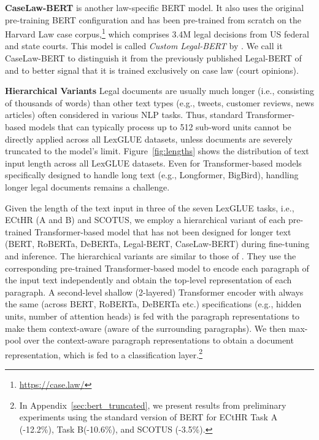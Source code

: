 \documentclass[11pt]{article}
\begin{document}
\noindent\textbf{CaseLaw-BERT} \cite{zhengguha2021} is another law-specific BERT model. It also uses the original pre-training BERT configuration and has been pre-trained from scratch on the Harvard Law case corpus,\footnote{\url{https://case.law/}} which comprises 3.4M legal decisions from US federal and state courts. This model is called \emph{Custom Legal-BERT} by  \citet{zhengguha2021}. We call it CaseLaw-BERT to distinguish it from the previously published Legal-BERT of \citet{chalkidis-etal-2020-legalbert} and to better signal that it is trained exclusively on case law (court opinions).\vspace{2mm}

\noindent\textbf{Hierarchical Variants} Legal documents are usually much longer (i.e., consisting of thousands of words) than other text types (e.g., tweets, customer reviews, news articles) often considered in various NLP tasks. Thus, standard Transformer-based models that can typically process up to 512 sub-word units cannot be directly applied across all LexGLUE datasets, unless documents are severely truncated to the model's limit.  Figure~\ref{fig:lengths} shows  the distribution of text input length across all LexGLUE datasets. Even for Transformer-based models specifically designed to handle long text (e.g., Longformer, BigBird), handling longer legal documents remains a challenge. 

Given the length of the text input in three of the seven LexGLUE tasks, i.e., ECtHR (A and B) and SCOTUS, we employ a hierarchical variant of each pre-trained Transformer-based model that has not been designed for longer text (BERT, RoBERTa, DeBERTa, Legal-BERT, CaseLaw-BERT) during fine-tuning and inference. The hierarchical variants are similar to those of \citet{chalkidis-et-al-2021-ecthr}. They use the corresponding pre-trained Transformer-based model to encode each paragraph of the input text independently and obtain the top-level representation  of each paragraph. A second-level shallow (2-layered) Transformer encoder with always the same (across BERT, RoBERTa, DeBERTa etc.) specifications (e.g., hidden units, number of attention heads) is fed with the paragraph representations to make them context-aware (aware of the surrounding paragraphs). We then max-pool over the context-aware paragraph representations to obtain a document representation, which is fed to a classification layer.\footnote{In Appendix~\ref{sec:bert_truncated}, we present results from preliminary experiments using the standard version of BERT for ECtHR Task A (-12.2\%), Task B(-10.6\%), and SCOTUS (-3.5\%).}
\end{document}
